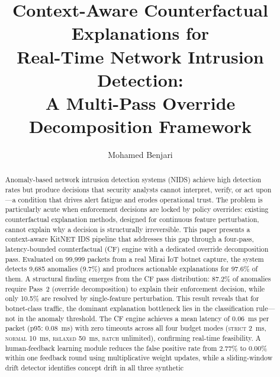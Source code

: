 \documentclass[preprint,12pt,authoryear]{elsarticle}
\begin{document}
\linenumbers   %

\begin{frontmatter}

\title{Context-Aware Counterfactual Explanations for\\
       Real-Time Network Intrusion Detection:\\
       A Multi-Pass Override Decomposition Framework}

\author[a]{Mohamed Benjari}


\begin{abstract}
Anomaly-based network intrusion detection systems (NIDS) achieve high detection
rates but produce decisions that security analysts cannot interpret, verify, or
act upon---a condition that drives alert fatigue and erodes operational trust.
The problem is particularly acute when enforcement decisions are locked by
policy overrides: existing counterfactual explanation methods, designed for
continuous feature perturbation, cannot explain why a decision is structurally
irreversible.
This paper presents a context-aware KitNET IDS pipeline that addresses this gap
through a four-pass, latency-bounded counterfactual (CF) engine with a dedicated
override decomposition pass.
Evaluated on 99{,}999 packets from a real Mirai IoT botnet capture, the system
detects 9{,}685 anomalies (9.7\%) and produces actionable explanations for
97.6\% of them.
A structural finding emerges from the CF pass distribution: 87.2\% of anomalies
require Pass~2 (override decomposition) to explain their enforcement decision,
while only 10.5\% are resolved by single-feature perturbation.
This result reveals that for botnet-class traffic, the dominant explanation
bottleneck lies in the classification rule---not in the anomaly threshold.
The CF engine achieves a mean latency of \SI{0.06}{\ms} per packet
(p95: \SI{0.08}{\ms}) with zero timeouts across all four budget modes
(\textsc{strict} \SI{2}{\ms}, \textsc{normal} \SI{10}{\ms},
\textsc{relaxed} \SI{50}{\ms}, \textsc{batch} unlimited), confirming
real-time feasibility.
A human-feedback learning module reduces the false positive rate from 2.77\% to
0.00\% within one feedback round using multiplicative weight updates, while a
sliding-window drift detector identifies concept drift in all three synthetic

\end{abstract}
\end{frontmatter}
\end{document}

